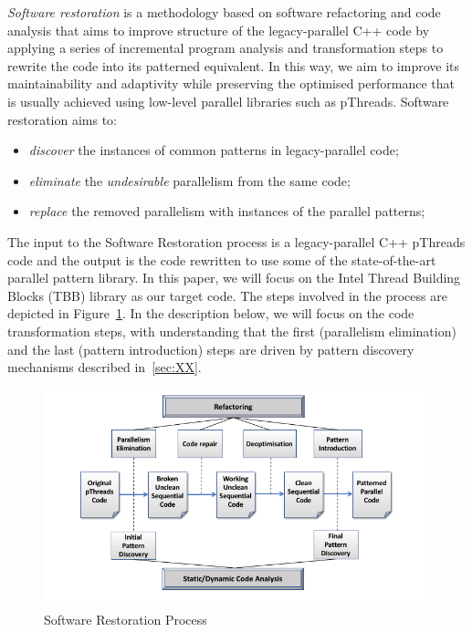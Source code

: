 \noindent
\emph{Software restoration} is a methodology based on software refactoring and code analysis that aims to improve structure
of the legacy-parallel C++ code by applying a series of incremental program analysis and transformation steps to rewrite the code into its patterned equivalent. In this way, we aim to improve its maintainability and adaptivity while preserving the optimised performance that is usually achieved using low-level parallel libraries such as pThreads. Software restoration aims to:
\begin{itemize}
\item \emph{discover} the instances of common patterns in legacy-parallel code;
\item \emph{eliminate} the \emph{undesirable} parallelism from the same code;
\item \emph{replace} the removed parallelism with instances of the parallel patterns;
\end{itemize}
\noindent
The input to the Software Restoration process is a legacy-parallel C++ pThreads code and the output is the code rewritten to use some of the state-of-the-art parallel pattern library. In this paper, we will focus on the Intel Thread Building Blocks (TBB) library as our target code. The steps involved in the process are depicted in Figure~\ref{fig:SoftRest}. In the description below, we will focus on the code transformation steps, with understanding that the first (parallelism elimination) and the last (pattern introduction) steps are driven by pattern discovery mechanisms described in~\ref{sec:XX}.

\begin{figure}
\centering
\includegraphics[width=\textwidth]{images/HLPP2020Paper.png}
\caption{Software Restoration Process}
\label{fig:SoftRest}
\end{figure}



